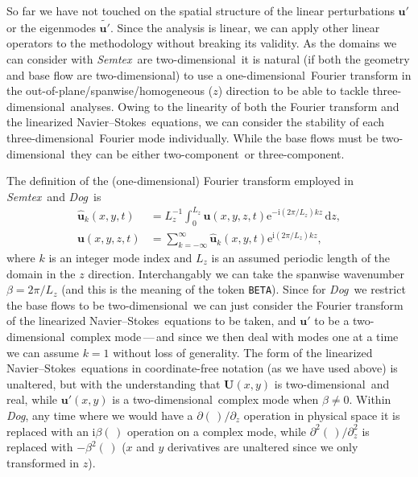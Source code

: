 \documentclass[11pt,a4paper]{report}
\newcommand\cd{\mathrm{d}}
\newcommand\ce{\mathrm{e}}
\newcommand\ci{\mathrm{i}}
\newcommand\wh[1]{\widehat{#1}}
\newcommand\wt[1]{\widetilde{#1}}
\newcommand\NavSto{Navier--Stokes}
\newcommand\LNS{linearized \NavSto}
\newcommand\oned{one-di\-men\-sion\-al}
\newcommand\twod{two-di\-men\-sion\-al}
\newcommand\threed{three-di\-men\-sion\-al}
\newcommand\twoc{two-com\-po\-nent}
\newcommand\threec{three-com\-po\-nent}
\newcommand\Ubase{{\bm{U}}}
\newcommand\upert{{\bm{u}'}}
\newcommand{\Semtex}{\emph{Semtex}}
\newcommand{\Dog}{\emph{Dog}}
\begin{document}
So far we have not touched on the spatial structure of the linear
perturbations $\upert$ or the eigenmodes $\wt{\upert}$. Since the
analysis is linear, we can apply other linear operators to the
methodology without breaking its validity. As the domains we can
consider with \Semtex\ are \twod\ it is natural (if both the geometry
and base flow are \twod) to use a \oned\ Fourier transform in the
out-of-plane/spanwise/homogeneous ($z$) direction to be able to tackle
\threed\ analyses.  Owing to the linearity of both the Fourier
transform and the \LNS\ equations, we can consider the stability of
each \threed\ Fourier mode individually.  While the base flows must be
\twod\, they can be either \twoc\ or \threec.

The definition of the (\oned) Fourier transform employed in
\Semtex\ and \Dog\ is
\begin{align}
\wh{\bm{u}}_k(x,y,t) &=
L_z^{-1}\int_0^{L_z}\bm{u}(x,y,z,t)\ce^{-\ci(2\pi/L_z)kz}\,\cd z,\\
\bm{u}(x,y,z,t) &= 
\sum_{k=-\infty}^\infty\wh{\bm{u}}_k(x,y,t)\ce^{\ci(2\pi/L_z)kz},
\end{align}
where $k$ is an integer mode index and $L_z$ is an assumed periodic
length of the domain in the $z$ direction.  Interchangably we can take
the spanwise wavenumber $\beta=2\pi/L_z$ (and this is the meaning of
the token \verb+BETA+).  Since for \Dog\ we restrict the base flows to
be \twod\, we can just consider the Fourier transform of the
\LNS\ equations to be taken, and $\upert$ to be a \twod\ complex
mode\,---\,and since we then deal with modes one at a time we can
assume $k=1$ without loss of generality.  The form of the
\LNS\ equations in coordinate-free notation (as we have used above) is
unaltered, but with the understanding that $\Ubase(x,y)$ is \twod\ and
real, while $\upert(x,y)$ is a \twod\ complex mode when $\beta\ne0$.
Within \Dog, any time where we would have a $\partial(\,)/\partial_z$
operation in physical space it is replaced with an $\ci\beta(\,)$
operation on a complex mode, while $\partial^2(\,)/\partial_z^2$ is
replaced with $-\beta^2(\,)$ ($x$ and $y$ derivatives are unaltered
since we only transformed in $z$).
\end{document}
